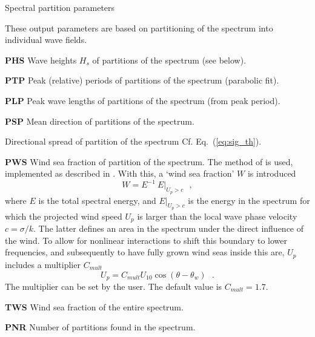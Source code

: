 \begin{list}{)\hfill}
\item{Spectral partition parameters} \label{out:spec_part}

These output parameters are based on
partitioning of the spectrum into individual wave fields.

\begin{list}{)\hfill}
            { \leftmargin 8mm 
             \rightmargin 5mm \itemsep 0mm \parsep 0mm}


\item \textbf{PHS}  Wave heights $H_s$ of partitions of the spectrum (see
      below). \label{out:first_part}
\item \textbf{PTP} Peak (relative) periods of partitions of the spectrum (parabolic fit).
\item \textbf{PLP} Peak wave lengths of partitions of the spectrum (from peak period).
\item \textbf{PSP} Mean direction of partitions of the spectrum.
\item Directional spread of partition of the spectrum
      Cf. Eq.~(\ref{eq:sig_th}).
\item \textbf{PWS} Wind sea fraction of partition of the spectrum.  The method of
\cite{art:HP01} is used, implemented as described in \cite{tol:Oahu07a}. With
this, a `wind sea fraction' $W$ is introduced
\begin{equation}
W = E^{-1}  \: E |_{U_p > c}  \:\:\: , \label{eq:wsf}
\end{equation}
where $E$ is the total spectral energy, and $E |_{U_p > c}$ is the energy in
the spectrum for which the projected wind speed $U_p$ is larger than the local
wave phase velocity $c = \sigma / k$. The latter defines an area in the
spectrum under the direct influence of the wind. To allow for nonlinear
interactions to shift this boundary to lower frequencies, and subsequently to
have fully grown wind seas inside this are, $U_p$ includes a multiplier
$C_{mult}$
\begin{equation}
U_p = C_{mult} U_{10} \cos ( \theta - \theta_w )  \:\:\: . \label{eq:Up}
\end{equation}
The multiplier can be set by the user. The default value is $C_{mult} = 1.7$.
\item \textbf{TWS} Wind sea fraction of the entire spectrum.
\item \textbf{PNR} Number of partitions found in the spectrum. \label{out:last_part}
\end{list}


\end{list}
